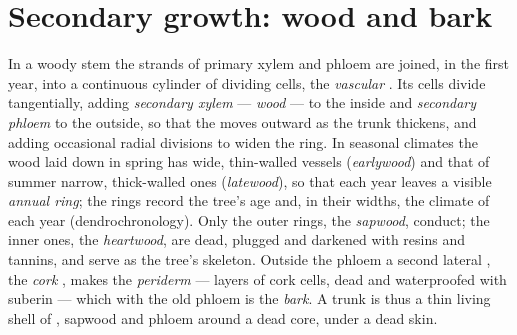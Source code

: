 \section{Secondary growth: wood and bark}

\begin{definition}\label{def:b2:plant-meristems:wood}
In a woody stem the strands of primary xylem and phloem are joined,
in the first year, into a continuous cylinder of dividing cells,
the \emph{vascular }. Its cells divide tangentially, adding
\emph{secondary xylem} --- \emph{wood} --- to the inside and
\emph{secondary phloem} to the outside, so that the  moves
outward as the trunk thickens, and adding occasional radial
divisions to widen the ring. In seasonal climates the wood laid down
in spring has wide, thin-walled vessels (\emph{earlywood}) and that
of summer narrow, thick-walled ones (\emph{latewood}), so that each
year leaves a visible \emph{annual ring}; the rings record the
tree's age and, in their widths, the climate of each year
(dendrochronology). Only the outer rings, the \emph{sapwood},
conduct; the inner ones, the \emph{heartwood}, are dead, plugged
and darkened with resins and tannins, and serve as the tree's
skeleton. Outside the phloem a second lateral , the
\emph{cork }, makes the \emph{periderm} --- layers of cork
cells, dead and waterproofed with suberin --- which with the old
phloem is the \emph{bark}. A trunk is thus a thin living shell of
, sapwood and phloem around a dead core, under a dead skin.
\end{definition}

